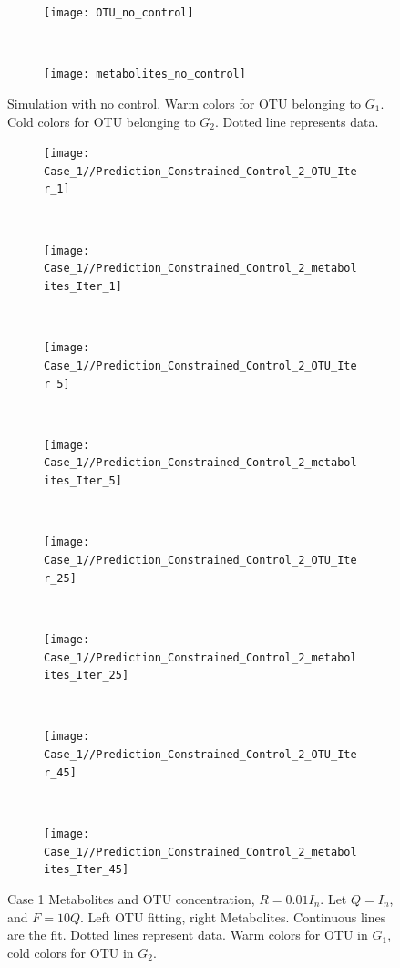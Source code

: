 \documentclass[3p,times]{elsarticle}
\begin{document}
\begin{figure}[ht]
	\centering
	\begin{subfigure}[b]{0.32\textheight}
		\texttt{[image: OTU\_no\_control]}
	\end{subfigure}
	~
	\begin{subfigure}[b]{0.32\textheight}
		\texttt{[image: metabolites\_no\_control]}
	\end{subfigure}
	\caption{Simulation with no control. Warm colors for OTU belonging to $G_1$. Cold colors for OTU belonging to $G_2$. Dotted line represents data.}
	\label{NoControlSimulation}
\end{figure}
\clearpage



\begin{figure}
	\centering
	\begin{subfigure}[b]{0.32\textheight}
		\texttt{[image: Case\_1//Prediction\_Constrained\_Control\_2\_OTU\_Iter\_1]}
	\end{subfigure}
	~
	\begin{subfigure}[b]{0.32\textheight}
		\texttt{[image: Case\_1//Prediction\_Constrained\_Control\_2\_metabolites\_Iter\_1]}
	\end{subfigure}
	~	
	\begin{subfigure}[b]{0.32\textheight}
		\texttt{[image: Case\_1//Prediction\_Constrained\_Control\_2\_OTU\_Iter\_5]}
	\end{subfigure}
	~
	\begin{subfigure}[b]{0.32\textheight}
		\texttt{[image: Case\_1//Prediction\_Constrained\_Control\_2\_metabolites\_Iter\_5]}
	\end{subfigure}
	~
	\begin{subfigure}[b]{0.32\textheight}
		\texttt{[image: Case\_1//Prediction\_Constrained\_Control\_2\_OTU\_Iter\_25]}
	\end{subfigure}
	~
	\begin{subfigure}[b]{0.32\textheight}
		\texttt{[image: Case\_1//Prediction\_Constrained\_Control\_2\_metabolites\_Iter\_25]}
	\end{subfigure}
	~
	\begin{subfigure}[b]{0.32\textheight}
		\texttt{[image: Case\_1//Prediction\_Constrained\_Control\_2\_OTU\_Iter\_45]}
	\end{subfigure}
	~
	\begin{subfigure}[b]{0.32\textheight}
		\texttt{[image: Case\_1//Prediction\_Constrained\_Control\_2\_metabolites\_Iter\_45]}
	\end{subfigure}
	\caption{Case 1 Metabolites and OTU concentration,  $R = 0.01 I_n$. Let $Q = I_n$, and $F = 10Q$. Left OTU fitting, right Metabolites. Continuous lines are the fit. Dotted lines represent data. Warm colors for OTU in $G_1$, cold colors for OTU in $G_2$.}
	\label{Case 1 Metabolites OTU}
\end{figure}
\end{document}
